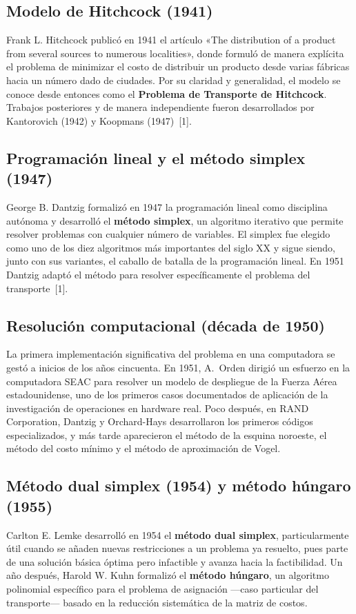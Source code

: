 \documentclass[10pt,letterpaper,twocolumn]{article}
\begin{document}
\subsection{Modelo de Hitchcock (1941)}
Frank L. Hitchcock publicó en 1941 el artículo «The distribution of a product from several sources to numerous localities», donde formuló de manera explícita el problema de minimizar el costo de distribuir un producto desde varias fábricas hacia un número dado de ciudades. Por su claridad y generalidad, el modelo se conoce desde entonces como el \textbf{Problema de Transporte de Hitchcock}. Trabajos posteriores y de manera independiente fueron desarrollados por Kantorovich (1942) y Koopmans (1947)~[1].

\subsection{Programación lineal y el método simplex (1947)}
George B. Dantzig formalizó en 1947 la programación lineal como disciplina autónoma y desarrolló el \textbf{método simplex}, un algoritmo iterativo que permite resolver problemas con cualquier número de variables. El simplex fue elegido como uno de los diez algoritmos más importantes del siglo XX y sigue siendo, junto con sus variantes, el caballo de batalla de la programación lineal. En 1951 Dantzig adaptó el método para resolver específicamente el problema del transporte~[1].

\subsection{Resolución computacional (década de 1950)}
La primera implementación significativa del problema en una computadora se gestó a inicios de los años cincuenta. En 1951, A.~Orden dirigió un esfuerzo en la computadora SEAC para resolver un modelo de despliegue de la Fuerza Aérea estadounidense, uno de los primeros casos documentados de aplicación de la investigación de operaciones en hardware real. Poco después, en RAND Corporation, Dantzig y Orchard-Hays desarrollaron los primeros códigos especializados, y más tarde aparecieron el método de la esquina noroeste, el método del costo mínimo y el método de aproximación de Vogel.

\subsection{Método dual simplex (1954) y método húngaro (1955)}
Carlton E. Lemke desarrolló en 1954 el \textbf{método dual simplex}, particularmente útil cuando se añaden nuevas restricciones a un problema ya resuelto, pues parte de una solución básica óptima pero infactible y avanza hacia la factibilidad. Un año después, Harold W. Kuhn formalizó el \textbf{método húngaro}, un algoritmo polinomial específico para el problema de asignación ---caso particular del transporte--- basado en la reducción sistemática de la matriz de costos.
\end{document}

